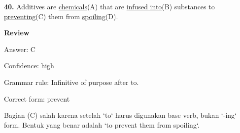 \documentclass[12pt]{article}
\begin{document}
\par
\vspace{\questionblockgap}
\noindent\textbf{40.} Additives are \uline{chemicals}(A) that are \uline{infused into}(B) substances to \uline{preventing}(C) them from \uline{spoiling}(D).
\par
\begingroup
\setlength{\parskip}{0pt}
\setlength{\parindent}{0pt}
\textbf{Review}\par
Answer: C\par
Confidence: high\par
Grammar rule: Infinitive of purpose after to.\par
Correct form: prevent\par
Bagian (C) salah karena setelah `to` harus digunakan base verb, bukan `-ing` form. Bentuk yang benar adalah `to prevent them from spoiling`.\par
\endgroup
\par
\vspace{\questionblockgap}
\end{document}
